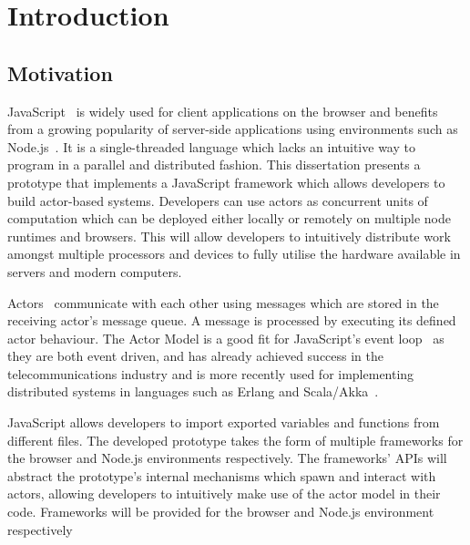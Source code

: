 \documentclass[oneside]{um-fict}
\begin{document}
\mainmatter
\chapter{Introduction}
\section{Motivation}
JavaScript~\cite{ecmascript} is widely used for client applications on the browser and benefits from a growing popularity of server-side applications using environments such as Node.js~\cite{nodejs}. It is a single-threaded language which lacks an intuitive way to program in a parallel and distributed fashion. This dissertation presents a prototype that implements a JavaScript framework which allows developers to build actor-based systems. Developers can use actors as concurrent units of computation which can be deployed either locally or remotely on multiple node runtimes and browsers. This will allow developers to intuitively distribute work amongst multiple processors and devices to fully utilise the hardware available in servers and modern computers.

Actors~\cite{hewitt1973session}\cite{43years} communicate with each other using messages which are stored in the receiving actor's message queue. A message is processed by executing its defined actor behaviour. The Actor Model is a good fit for JavaScript's event loop~\cite{eventloopbrowser}\cite{eventloopnode} as they are both event driven, and has already achieved success in the telecommunications industry and is more recently used for implementing distributed systems in languages such as Erlang and Scala/Akka~\cite{haller2012integration}.

JavaScript allows developers to import exported variables and functions from different files. The developed prototype takes the form of multiple frameworks for the browser and Node.js environments respectively. The frameworks' APIs will abstract the prototype's internal mechanisms which spawn and interact with actors, allowing developers to intuitively make use of the actor model in their code. Frameworks will be provided for the browser and Node.js environment respectively
\end{document}
